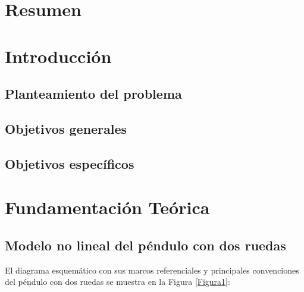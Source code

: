 \documentclass[11pt, twoside]{book}     %
\begin{document}
    \tableofcontents        %
    \thispagestyle{empty}   %
    \newpage

    \listoffigures          %
    \thispagestyle{empty}   %
    \newpage
    
    \listoftables           %
    \thispagestyle{empty}   %
    \newpage

    \setcounter{page}{1}   %

    \chapter{Resumen}

    \chapter{Introducción}
        \section{Planteamiento del problema}

        \section{Objetivos generales}

        \section{Objetivos específicos}


    \chapter{Fundamentación Teórica}  

        \section{Modelo no lineal del péndulo con dos ruedas}

            El diagrama esquemático con sus marcos referenciales y principales convenciones del péndulo con dos ruedas se muestra en la Figura \ref{Figura1}:
\end{document}
